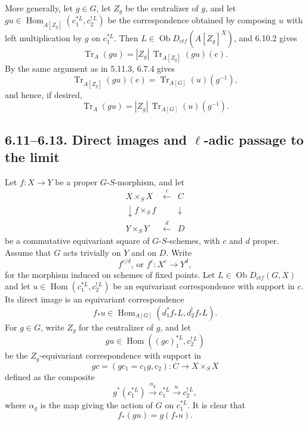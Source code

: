 \documentclass[11pt]{article}
\theoremstyle{plain}
\theoremstyle{definition}
\theoremstyle{remark}
\DeclareMathOperator{\Hom}{Hom}
\DeclareMathOperator{\ob}{Ob}
\DeclareMathOperator{\Tr}{Tr}
\begin{document}
More generally, let $g\in G$, let $Z_g$ be the centralizer of $g$, and let
$gu\in\Hom_{A[Z_g]}(c_1^{*L},c_2^{!\,L})$ be the correspondence obtained by
composing $u$ with left multiplication by $g$ on $c_1^{*L}$. Then
$L\in\ob D_{ctf}(A[Z_g]^X)$, and 6.10.2 gives
\begin{equation}\tag{6.10.3}
    \Tr_A(gu)=|Z_g|\,\Tr_{A[Z_g]}(gu)(e).
\end{equation}
By the same argument as in 5.11.3, 6.7.4 gives
\begin{equation}\tag{6.10.4}
    \Tr_{A[Z_g]}(gu)(e)=\Tr_{A[G]}(u)(g^{-1}),
\end{equation}
and hence, if desired,
\begin{equation}\tag{6.10.5}
    \Tr_A(gu)=|Z_g|\,\Tr_{A[G]}(u)(g^{-1}).
\end{equation}

\subsection*{6.11--6.13. Direct images and $\ell$-adic passage to the limit}

Let $f:X\to Y$ be a proper $G$-$S$-morphism, and let
\begin{equation}\tag{6.11.1}
\begin{array}{ccc}
X\times_S X & \xleftarrow{\ c\ } & C \\[4pt]
\downarrow\scriptstyle f\times_S f & & \downarrow \\[6pt]
Y\times_S Y & \xleftarrow{\ d\ } & D
\end{array}
\end{equation}
be a commutative equivariant square of $G$-$S$-schemes, with $c$ and $d$ proper.
Assume that $G$ acts trivially on $Y$ and on $D$. Write
\begin{equation}\tag{6.11.2}
       f^{c/d}\text{, or }f^c:X^c\longrightarrow Y^d,
\end{equation}
for the morphism induced on schemes of fixed points. Let
$L\in\ob D_{ctf}(G,X)$ and let
$u\in\Hom(c_1^{*L},c_2^{!\,L})$ be an equivariant correspondence with support in
$c$. Its direct image is an equivariant correspondence
\[
     f_*u\in\Hom_{A[G]}(d_1^{*}f_*L,d_2^{!}f_*L).
\]
For $g\in G$, write $Z_g$ for the centralizer of $g$, and let
\begin{equation}\tag{6.11.3}
      gu\in\Hom((gc)_1^{*L},c_2^{!\,L})
\end{equation}
be the $Z_g$-equivariant correspondence with support in
\begin{equation}\tag{6.11.4}
      gc=(gc_1=c_1g,c_2):C\longrightarrow X\times_S X
\end{equation}
defined as the composite
\[
      g^*(c_1^{*L})\xrightarrow{\alpha_g}c_1^{*L}\xrightarrow{u}c_2^{!\,L},
\]
where $\alpha_g$ is the map giving the action of $G$ on $c_1^{*L}$. It is clear that
\begin{equation}\tag{6.11.5}
      f_*(gu)=g(f_*u).
\end{equation}
\end{document}
